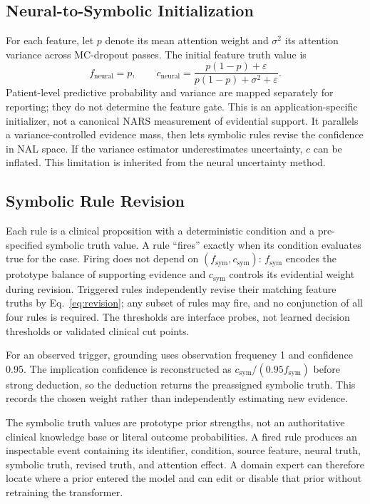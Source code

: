 \documentclass{article}
\begin{document}
\subsection{Neural-to-Symbolic Initialization}

For each feature, let $p$ denote its mean attention weight and $\sigma^2$ its attention variance across MC-dropout passes. The initial feature truth value is
\begin{equation}
f_{\text{neural}}=p,\qquad
c_{\text{neural}}=\frac{p(1-p)+\varepsilon}{p(1-p)+\sigma^2+\varepsilon}.
\label{eq:neural_to_nars}
\end{equation}
Patient-level predictive probability and variance are mapped separately for reporting; they do not determine the feature gate. This is an application-specific initializer, not a canonical NARS measurement of evidential support. It parallels a variance-controlled evidence mass, then lets symbolic rules revise the confidence in NAL space. If the variance estimator underestimates uncertainty, $c$ can be inflated. This limitation is inherited from the neural uncertainty method.

\subsection{Symbolic Rule Revision}

Each rule is a clinical proposition with a deterministic condition and a pre-specified symbolic truth value. A rule ``fires'' exactly when its condition evaluates true for the case. Firing does not depend on $(f_{\mathrm{sym}},c_{\mathrm{sym}})$: $f_{\mathrm{sym}}$ encodes the prototype balance of supporting evidence and $c_{\mathrm{sym}}$ controls its evidential weight during revision. Triggered rules independently revise their matching feature truths by Eq.~\eqref{eq:revision}; any subset of rules may fire, and no conjunction of all four rules is required. The thresholds are interface probes, not learned decision thresholds or validated clinical cut points.

For an observed trigger, grounding uses observation frequency 1 and confidence 0.95. The implication confidence is reconstructed as $c_{\mathrm{sym}}/(0.95 f_{\mathrm{sym}})$ before strong deduction, so the deduction returns the preassigned symbolic truth. This records the chosen weight rather than independently estimating new evidence.

The symbolic truth values are prototype prior strengths, not an authoritative clinical knowledge base or literal outcome probabilities. A fired rule produces an inspectable event containing its identifier, condition, source feature, neural truth, symbolic truth, revised truth, and attention effect. A domain expert can therefore locate where a prior entered the model and can edit or disable that prior without retraining the transformer.
\end{document}

